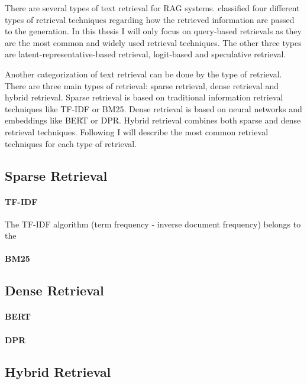 
There are several types of text retrieval for RAG systems. \cite{Zhao.29.02.2024} classified four different types of retrieval techniques regarding how the retrieved information are passed to the generation. In this thesis I will only focus on query-based retrievals as they are the most common and widely used retrieval techniques. The other three types are latent-representative-based retrieval, logit-based and speculative retrieval.

Another categorization of text retrieval can be done by the type of retrieval. There are three main types of retrieval: sparse retrieval, dense retrieval and hybrid retrieval. Sparse retrieval is based on traditional information retrieval techniques like TF-IDF or BM25. Dense retrieval is based on neural networks and embeddings like BERT or DPR. Hybrid retrieval combines both sparse and dense retrieval techniques. Following I
 will describe the most common retrieval techniques for each type of retrieval.

\subsection{Sparse Retrieval}
\label{sec:sparse_retrieval}

\paragraph{TF-IDF}
\label{sec:tfidf}

The TF-IDF algorithm (term frequency - inverse document frequency) belongs to the 

\paragraph{BM25}
\label{sec:bm25}

\subsection{Dense Retrieval}
\label{sec:dense_retrieval}

\paragraph{BERT}
\label{sec:bert}

\paragraph{DPR}
\label{sec:dpr}

\subsection{Hybrid Retrieval}
\label{sec:hybrid_retrieval}